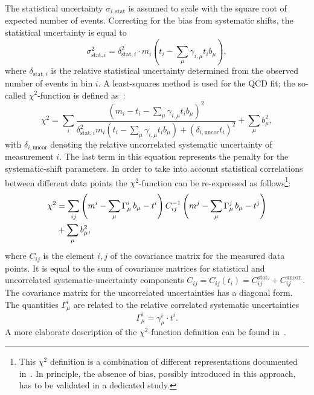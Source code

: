 The statistical uncertainty $\sigma_{i,\text{stat}}$ is assumed to scale with the square root of expected number of events. Correcting for the bias from systematic shifts, the statistical uncertainty is equal to
\begin{equation}
 \sigma_{\text{stat},i}^2 = \delta_{\text{stat},i}^2\cdot m_i\left( t_i - \sum_\mu\gamma_{i,\mu}t_ib_\mu \right),
\end{equation}
where $\delta_{\text{stat},i}$ is the relative statistical uncertainty determined from the observed number of events in bin $i$. A least-squares method is used for the QCD fit; the so-called $\chi^2$-function is defined as~\cite{Aaron:2009aa}:
\begin{equation}
 \chi^2 = \sum_i{ \frac{\left( m_i-t_i-\sum_{\mu}{\gamma_{i,\mu} t_i b_\mu} \right)^2 }{ \delta_{\text{stat},i}^2 m_i \left( t_i - \sum_\mu{\gamma_{i,\mu}t_ib_\mu} \right)+ \left( \delta_{i,\text{uncor}}t_i\right)^2 } } + \sum_{\mu}{b_\mu^2},
 \label{eq:chi2uncorr}
\end{equation}
with $\delta_{i,\text{uncor}}$ denoting the relative uncorrelated systematic uncertainty of measurement $i$. The last term in this equation represents the penalty for the sys\-te\-ma\-tic-shift parameters. In order to take into account statistical correlations between different data points the $\chi^2$-function can be re-expressed as follows\footnote{This $\chi^2$ definition is a combination of different representations documented in~\cite{herafitter:2014:manual}. In principle, the absence of bias, possibly introduced in this approach, has to be validated in a dedicated study.}:
\begin{align}
 \chi^2 &= \sum_{ij}{\left( m^i -\sum_{\mu}{\Gamma_\mu^i\,b_\mu - t^i }\right) C^{-1}_{ij} \left( m^j -\sum_{\mu}{\Gamma_\mu^j\,b_\mu - t^j }\right) }\notag\\
                                           &+ \sum_{\mu}{b_\mu^2},
 \label{eq:chi2corr}
\end{align}
where $C_{ij}$ is the element $i,j$ of the covariance matrix for the measured data points. It is equal to the sum of covariance matrices for statistical and uncorrelated systematic-uncertainty components $C_{ij}=C_{ij}\left(t_i\right)=C_{ij}^{\text{stat.}}+C_{ij}^{\text{uncor.}}$. The covariance matrix for the uncorrelated uncertainties has a diagonal form. The quantities $\Gamma_\mu^i$ are related to the relative correlated systematic uncertainties
\begin{equation}
 \Gamma_{\mu}^i = \gamma_{\mu}^i \cdot t^i. 
\end{equation}
A more elaborate description of the $\chi^2$-function definition can be found in~\cite{herafitter:2014:manual}.

